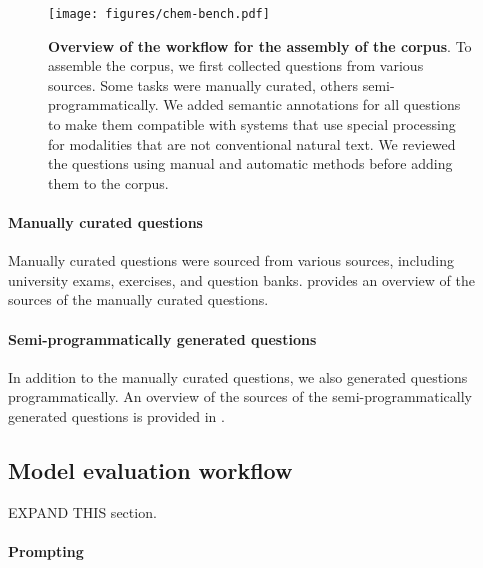 \documentclass[11pt, oneside]{article}
\begin{document}
\begin{refsection}
\begin{figure}[!h]
    \texttt{[image: figures/chem-bench.pdf]}
    \caption{\textbf{Overview of the workflow for the assembly of the \chembench corpus}. 
    To assemble the \chembench corpus, we first collected questions from various sources. Some tasks were manually curated, others semi-programmatically. We added semantic annotations for all questions to make them compatible with systems that use special processing for modalities that are not conventional natural text. We reviewed the questions using manual and automatic methods before adding them to the corpus.}
    \label{fig:curation_workflow}
\end{figure}

\paragraph{Manually curated questions}
Manually curated questions were sourced from various sources, including university exams, exercises, and question banks.  provides an overview of the sources of the manually curated questions.

%



\paragraph{Semi-programmatically generated questions}
In addition to the manually curated questions, we also generated questions programmatically. An overview of the sources of the semi-programmatically generated questions is provided in .


%


\clearpage

\subsection{Model evaluation workflow}
EXPAND THIS section. 

\paragraph{Prompting}


\end{refsection}
\end{document}
